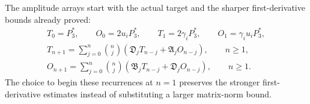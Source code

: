 The amplitude arrays start with the actual target and the sharper
first-derivative bounds already proved:
\begin{equation}\label{tgdc:amplitude_majorants}
\begin{gathered}
 T_0=P_3^*,\qquad O_0=2u_iP_3^*,\qquad
 T_1=2\gamma_iP_3^*,\qquad O_1=\gamma_i u_iP_3^*,\\
 T_{n+1}=\sum_{j=0}^n\binom nj
      (\mathfrak D_jT_{n-j}+\mathfrak A_jO_{n-j}),\qquad n\geq1,\\
 O_{n+1}=\sum_{j=0}^n\binom nj
      (\mathfrak B_jT_{n-j}+\mathfrak D_jO_{n-j}),\qquad n\geq1.
\end{gathered}
\end{equation}
The choice to begin these recurrences at $n=1$ preserves the stronger
first-derivative estimates instead of substituting a larger matrix-norm
bound.

